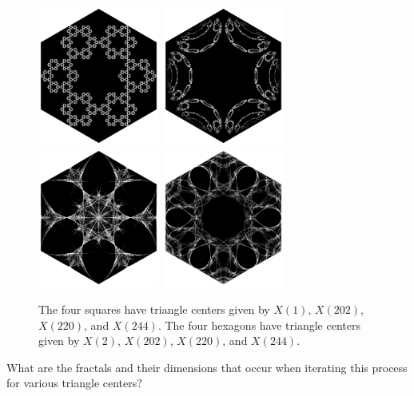 \documentclass{article}
\begin{document}
\begin{figure}[ht!]
  \noindent
  \includegraphics[width=4cm]{assets/129_problem/Hexagon_X002.png}
  \includegraphics[width=4cm]{assets/129_problem/Hexagon_X202.png}
  \includegraphics[width=4cm]{assets/129_problem/Hexagon_X220.png}
  \includegraphics[width=4cm]{assets/129_problem/Hexagon_X244.png}
  \caption{
    The four squares have triangle centers given by $X(1)$, $X(202)$, $X(220)$, and $X(244)$.
    The four hexagons have triangle centers given by $X(2)$, $X(202)$, $X(220)$, and $X(244)$.
  }
\end{figure}

\begin{question}
  What are the fractals and their dimensions that occur when iterating this
  process for various triangle centers?
\end{question}
\end{document}
